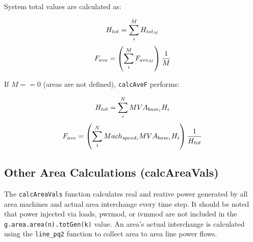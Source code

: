 \noindent System total values are calculated as:

\begin{equation}{\label{eq: systemH} }
H_{tot} = \sum_{i}^{M} H_{tot_M}
\end{equation} 
\vspace{-1em}
\begin{equation}{\label{eq: systemF} }
F_{ave} = \left( \sum_{i}^{M} F_{ave_M} \right) \dfrac{1}{M}
\end{equation}
\vspace{0.5 em}

\noindent If $M==0$ (areas are not defined), \verb|calcAveF| performs:

\begin{equation}{\label{eq: systemH2} }
H_{tot} = \sum_{i}^{N} MVA_{base_i}H_i 
\end{equation} 
\vspace{-1em}
\begin{equation}{\label{eq: systemF2} }
F_{ave} = \left( \sum_{i}^{N}Mach_{speed_i}MVA_{base_i}H_i \right) \dfrac{1}{H_{tot}}
\end{equation}\vspace{0.5 em}

\pagebreak
\subsection{Other Area Calculations (calcAreaVals)}  
The \verb|calcAreaVals| function calculates real and reative power generated by all area machines and actual area interchange every time step.
It should be noted that power injected via loads, pwrmod, or ivmmod are not included in the \verb|g.area.area(n).totGen(k)| value.
An area's actual interchange is calculated using the \verb|line_pq2| function to collect area to area line power flows.

